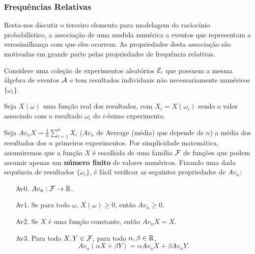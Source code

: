 \begin{frame}
\frametitle{\textbf{Frequências Relativas}}
\baselineskip=13pt
\begin{block}{}

Resta-nos discutir o terceiro elemento para modelagem do raciocínio
probabilístico, a associação de uma medida numérica a eventos que
representam a verosimilhança com que eles ocorrem. As propriedades
desta associação são motivadas em grande parte pelas propriedades de
frequência relativas. 

Considere uma coleção de experimentos
aleatórios ${\cal E}_i$ que possuem a mesma álgebra de eventos ${\cal A}$ e tem
resultados individuais não necessariamente numéricos $\{\omega_i\}$.


Seja $X(\omega)$ uma função real dos resultados, com
$X_i=X(\omega_i)$ sendo o valor associado com o resultado $\omega_i$
do $i$-ésimo experimento.

\end{block}

\begin{block}{}
	
	Seja $Av_nX=\frac{1}{n}\sum_{i=1}^{n}X_i$ ($Av_n$ de Average (média) que depende de $n$)
	a média dos resultados dos $n$ primeiros experimentos. Por
	simplicidade matemática, assumiremos que a função $X$ é escolhida de
	uma família ${\cal F}$ de funções que podem assumir apenas um {\bf número
	finito} de valores numéricos. Fixando uma dada sequência de
	resultados $\{\omega_i\}$, é fácil verificar as seguintes
	propriedades de $Av_n$:
	
	\begin{enumerate}
		\item[Av0.] $Av_n:{\cal F}\rightarrow \mathbb{R}$.
		
		\item[Av1.] Se para todo $\omega$, $X(\omega)\geq 0$, então $Av_n\geq
		0$.
		
		\item[Av2.] Se $X$ é uma função constante, então $Av_nX=X$.
		
		\item[Av3.] Para todo $X,Y\in{\cal F}$, para todo $\alpha,\beta\in\mathbb{R}$,
		$$Av_n(\alpha X+\beta Y)=\alpha Av_nX +\beta Av_nY.$$
	\end{enumerate}
	
\end{block}

\end{frame}

